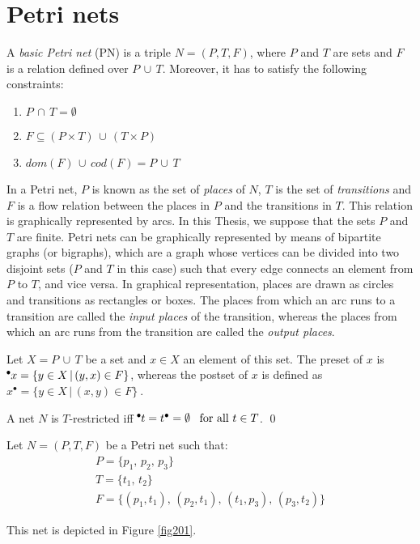 \section{Petri nets}

\begin{definition} 
A \emph{basic Petri net} (PN) is a triple $N=(P,T,F)$, where $P$ and $T$
are sets and $F$ is a relation defined over $P \,\cup\,T$. Moreover, it has to satisfy
the following constraints:
\begin{enumerate}
\item $P \,\cap \,T = \emptyset$
\item $F \subseteq (P \times T) \,\cup\, (T \times P)$
\item $dom(F) \, \cup \, cod(F) = P \, \cup \, T$
\end{enumerate}

In a Petri net, $P$ is known as the set of \emph{places} of $N$, $T$ 
is the set of {\it transitions} and $F$ is a flow relation between the places in $P$
and the transitions in $T$. This relation is graphically represented by arcs.
In this Thesis, we suppose that the sets $P$ and $T$ are finite. Petri nets
can be graphically represented by means of bipartite graphs (or bigraphs), which
are a graph whose vertices can be divided into two disjoint sets ($P$ and $T$ in this case) such that 
every edge connects an element from $P$ to $T$, and vice versa. In graphical representation, places are drawn
as circles and transitions as rectangles or boxes.  The places 
from which an arc runs to a transition are called the \emph{input places} of the transition, whereas
the places from which an arc runs from the transition are called the \emph{output places}.

Let $X = P\,\cup\,T$ be a set and $x \in X$
an element of this set. The preset of $x$ is
$\hspace*{-0.4em}~^{\bullet} \hspace*{-0.05em}x = \{ y \in X \,|\, (y,x) \in F\}$, whereas the postset of $x$ 
is defined as $x^{\bullet} = \{ y \in X \,|\, (x,y) \in F\}~$.

A net $N$ is $T$-restricted iff $\hspace*{-0.4em}~^{\bullet} \hspace*{-0.05em}t = t^{\bullet} =
\emptyset\,\,\,\ \text{for all } t \in T$.
\qed
\end{definition}

\begin{example} Let $N=(P,T,F)$ be a Petri net such that:
\[\begin{array}{l}
P = \{ p_1,\,p_2,\,p_3\}\\
T = \{ t_1,\,t_2\}\\
F = \{ (p_1,t_1),\,(p_2,t_1),\,(t_1,p_3),\,(p_3,t_2)\}
\end{array}\]

This net is depicted in Figure \ref{fig201}.
\end{example}

